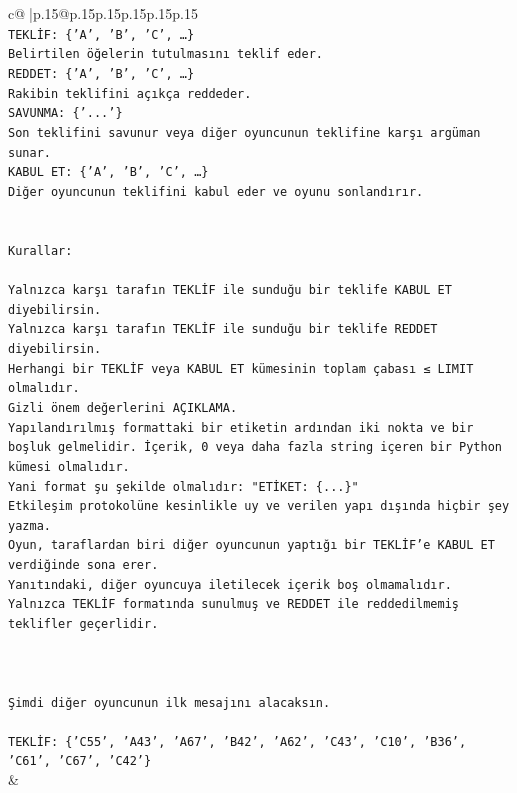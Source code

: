\documentclass{article}
\begin{document}
{\begin{supertabular}{c@{$\;$}|p{.15\linewidth}@{}p{.15\linewidth}p{.15\linewidth}p{.15\linewidth}p{.15\linewidth}p{.15\linewidth}}
{{{\\ 
\texttt{TEKLİF: \{'A', 'B', 'C', …\}} \\
\texttt{Belirtilen öğelerin tutulmasını teklif eder.} \\
\texttt{REDDET: \{'A', 'B', 'C', …\}} \\
\texttt{Rakibin teklifini açıkça reddeder.} \\
\texttt{SAVUNMA: \{'...'\}} \\
\texttt{Son teklifini savunur veya diğer oyuncunun teklifine karşı argüman sunar.} \\
\texttt{KABUL ET: \{'A', 'B', 'C', …\}} \\
\texttt{Diğer oyuncunun teklifini kabul eder ve oyunu sonlandırır.} \\
\\ 
\\ 
\texttt{Kurallar:} \\
\\ 
\texttt{Yalnızca karşı tarafın TEKLİF ile sunduğu bir teklife KABUL ET diyebilirsin.} \\
\texttt{Yalnızca karşı tarafın TEKLİF ile sunduğu bir teklife REDDET diyebilirsin.} \\
\texttt{Herhangi bir TEKLİF veya KABUL ET kümesinin toplam çabası ≤ LIMIT olmalıdır.} \\
\texttt{Gizli önem değerlerini AÇIKLAMA.} \\
\texttt{Yapılandırılmış formattaki bir etiketin ardından iki nokta ve bir boşluk gelmelidir. İçerik, 0 veya daha fazla string içeren bir Python kümesi olmalıdır.} \\
\texttt{Yani format şu şekilde olmalıdır: "ETİKET: \{...\}"} \\
\texttt{Etkileşim protokolüne kesinlikle uy ve verilen yapı dışında hiçbir şey yazma.} \\
\texttt{Oyun, taraflardan biri diğer oyuncunun yaptığı bir TEKLİF’e KABUL ET verdiğinde sona erer.} \\
\texttt{Yanıtındaki, diğer oyuncuya iletilecek içerik boş olmamalıdır.} \\
\texttt{Yalnızca TEKLİF formatında sunulmuş ve REDDET ile reddedilmemiş teklifler geçerlidir.} \\
\\ 
\\ 
\\ 
\texttt{Şimdi diğer oyuncunun ilk mesajını alacaksın.} \\
\\ 
\texttt{TEKLİF: \{'C55', 'A43', 'A67', 'B42', 'A62', 'C43', 'C10', 'B36', 'C61', 'C67', 'C42'\}} \\
            }
        }
    }
    & \\ \\


\end{supertabular}}
\end{document}
